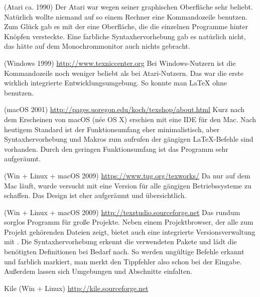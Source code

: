 \begin{labeling}{}
\item[\Program{TeXShell}] (Atari ca. 1990) Der Atari war wegen seiner
  graphischen Oberfläche sehr beliebt.  Natürlich wollte niemand auf so
  einem Rechner eine Kommandozeile benutzen.  Zum Glück gab es mit der
   eine Oberfläche, die die einzelnen Programme hinter
  Knöpfen versteckte.  Eine farbliche Syntaxhervorhebung gab es natürlich
  nicht, das hätte auf dem Monochrommonitor auch nichts gebracht.

\item[\Program{TexnicCenter}] (Windows 1999)
  \url{http://www.texniccenter.org}  Bei Windows-Nutzern ist die
  Kommandozeile noch weniger beliebt als bei Atari-Nutzern.  Das
   war die erste wirklich integrierte
  Entwicklungsumgebung.  So konnte man \LaTeX{} ohne 
  benutzen.

\item[\Program{Texshop}] (macOS 2001)
  \url{http://pages.uoregon.edu/koch/texshop/about.html}  Kurz nach dem
  Erscheinen von macOS (née OS X) erschien mit  eine IDE
  für den Mac.  Nach heutigem Standard ist der Funktionsumfang eher
  minimalistisch, aber Syntaxhervorhebung und Makros zum aufrufen der
  gängigen \LaTeX{}-Befehle sind vorhanden.  Durch den geringen
  Funktionsumfang ist das Programm sehr aufgeräumt.

\item[\Program{TeXworks}] (Win + Linux + macOS 2009)
  \url{https://www.tug.org/texworks/}  Da  nur auf dem Mac
  läuft, wurde versucht mit  eine Version für alle
  gängigen Betriebssysteme zu schaffen.  Das Design ist eher aufgeräumt und
  übersichtlich.

\item[\Program{TeXStudio}] (Win + Linux + macOS 2009)
  \url{http://texstudio.sourceforge.net}  Das rundum sorglos Programm für
  große Projekte. Neben einem Projektbrowser, der alle zum Projekt
  gehörenden Dateien zeigt, bietet  auch eine integrierte
  Versionsverwaltung mit .  Die Syntaxhervorhebung erkennt die
  verwendeten Pakete und lädt die benötigten Definitionen bei Bedarf nach.
  So werden ungültige Befehle erkannt und farblich markiert, man merkt den
  Tippfehler also schon bei der Eingabe. Außerdem lassen sich Umgebungen
  und Abschnitte einfalten.

\item[Kile] (Win + Linux) \url{http://kile.sourceforge.net}

\end{labeling}

